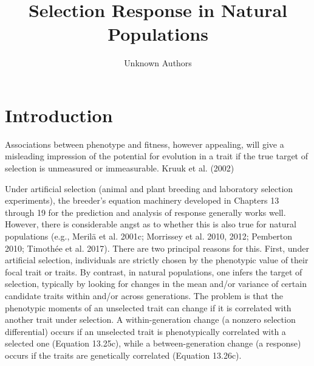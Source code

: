 \documentclass{article}
\title{Selection Response in Natural Populations}
\author{Unknown Authors}
\date{}
\begin{document}
\maketitle

\begin{abstract}

\end{abstract}

\section{Introduction}
Associations between phenotype and fitness, however appealing, will give a misleading impression of the potential for evolution in a trait if the true target of selection is unmeasured or immeasurable. Kruuk et al. (2002)

Under artificial selection (animal and plant breeding and laboratory selection experiments), the breeder's equation machinery developed in Chapters 13 through 19 for the prediction and analysis of response generally works well. However, there is considerable angst as to whether this is also true for natural populations (e.g., Merilä et al. 2001c; Morrissey et al. 2010, 2012; Pemberton 2010; Timothée et al. 2017). There are two principal reasons for this. First, under artificial selection, individuals are strictly chosen by the phenotypic value of their focal trait or traits. By contrast, in natural populations, one infers the target of selection, typically by looking for changes in the mean and/or variance of certain candidate traits within and/or across generations. The problem is that the phenotypic moments of an unselected trait can change if it is correlated with another trait under selection. A within-generation change (a nonzero selection differential) occurs if an unselected trait is phenotypically correlated with a selected one (Equation 13.25c), while a between-generation change (a response) occurs if the traits are genetically correlated (Equation 13.26c).
\end{document}
